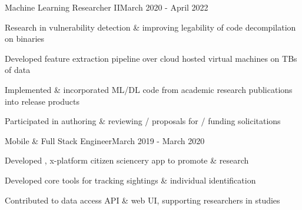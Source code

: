 \documentclass{article}
\newenvironment{**mylist}[2]{
  \subsubsection*{#1\hfill#2}
  \small
  \begin{list}{}{}
    \setlength{\topsep}{0pt}
   \setlength{\itemsep}{1pt}
   \setlength{\parskip}{0pt}
   \setlength{\parsep}{0pt}}{\end{list}\normalsize}
\newcommand{\LU}[1]{\hspace{-1em}{\bf Technologies : #1}}
\begin{document}
\begin{**mylist}{\href{https://www.grammatech.com}{} \tabb Machine Learning Researcher II}{March 2020 - April 2022}
\item Research in vulnerability detection \& improving legability of code decompilation on binaries
\item Developed feature extraction pipeline over cloud hosted virtual machines on TBs of data
\item Implemented \& incorporated ML/DL code from academic research publications into release products
\item Participated in authoring \& reviewing / proposals for / funding solicitations
\end{**mylist}

\begin{**mylist}{\href{www.happywhale.com}{} \tabb Mobile \& Full Stack Engineer}{March 2019 - March 2020}
\item Developed \href{https://play.google.com/store/apps/details?id=com.animalus.scidir&hl=en_US}{}, x-platform citizen sciencery app to promote  \& research
\item Developed core tools for tracking  sightings \& individual  identification
\item Contributed to data access API \& web UI, supporting researchers in  studies
\end{**mylist}
\end{document}

